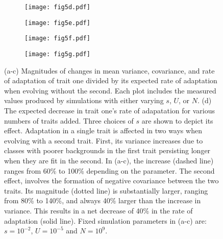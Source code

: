 \documentclass[11pt,twocolumn]{article}
\begin{document}
\begin{figure}[h!]
\begin{subfigure}[b!]{0.48\linewidth}
\centering
\texttt{[image: fig5d.pdf]}
\caption{}\label{fig:2a}
\end{subfigure}
\begin{subfigure}[b!]{0.48\linewidth}
\centering
\texttt{[image: fig5e.pdf]}
\caption{}\label{fig:2b}
\end{subfigure}

\begin{subfigure}[b]{0.48\linewidth}
\centering
\texttt{[image: fig5f.pdf]}
\caption{}\label{fig:2c}
\end{subfigure}
\begin{subfigure}[b]{0.48\linewidth}
\centering
\texttt{[image: fig5g.pdf]}
\caption{}\label{fig:2d}
\end{subfigure}
\caption{\footnotesize 
(a-c) Magnitudes of changes in mean variance, covariance, and rate of adaptation of trait one divided by its expected rate of adaptation when evolving without the second. Each plot includes the measured values produced by simulations with either varying $s$, $U$, or $N$. (d) The expected decrease in trait one's rate of adapatation for various numbers of traits added.  Three choices of $s$ are shown to depict its effect. Adaptation in a single trait is affected in two ways when evolving with a second trait. First, its variance increases due to classes with poorer backgrounds in the first trait persisting longer when they are fit in the second. In (a-c), the increase (dashed line) ranges from 60\% to 100\% depending on the parameter.  The second effect, involves the formation of negative covariance between the two traits. Its magnitude (dotted line) is substantially larger, ranging from 80\% to 140\%, and always 40\% larger than the increase in variance. This results in a net decrease of 40\% in the rate of adaptation (solid line). Fixed simulation parameters in (a-c) are: $s=10^{-2}$, $U=10^{-5}$ and $N=10^9$.}
\label{fig:2}
\end{figure}
\end{document}
